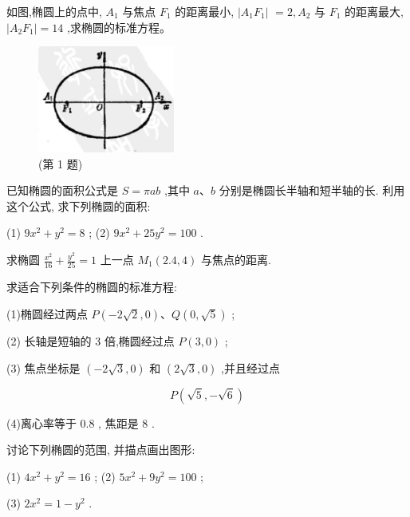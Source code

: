 \documentclass[lang=cn,newtx,12pt,scheme=chinese]{elegantbook}
\begin{document}
\begin{problemset}[习 题 六]

\item 如图,椭圆上的点中, \({A}_{1}\) 与焦点 \({F}_{1}\) 的距离最小, \(\left| {{A}_{1}{F}_{1}}\right|\) \(= 2,{A}_{2}\) 与 \({F}_{1}\) 的距离最大, \(\left| {{A}_{2}{F}_{1}}\right| = {14}\) ,求椭圆的标准方程。

\begin{figure}[h]
	\centering
	\includegraphics[max width=0.4\textwidth]{images/01912cc2-ffb6-728e-9ae7-b113ff05c64b_94_706053.jpg}
	\caption{(第 1 题)}
\end{figure}

\item 已知椭圆的面积公式是 \(S = {\pi ab}\) ,其中 \(a\text{、}b\) 分别是椭圆长半轴和短半轴的长. 利用这个公式, 求下列椭圆的面积:

(1) \(9{x}^{2} + {y}^{2} = 8\) ; (2) \(9{x}^{2} + {25}{y}^{2} = {100}\) .

\item 求椭圆 \(\frac{{x}^{2}}{16} + \frac{{y}^{2}}{25} = 1\) 上一点 \({M}_{1}\left( {{2.4},4}\right)\) 与焦点的距离.

\item 求适合下列条件的椭圆的标准方程:

(1)椭圆经过两点 \(P\left( {-2\sqrt{2},0}\right) \text{、}Q\left( {0,\sqrt{5}}\right)\) ;

(2) 长轴是短轴的 3 倍,椭圆经过点 \(P\left( {3,0}\right)\) ;

(3) 焦点坐标是 \(\left( {-2\sqrt{3},0}\right)\) 和 \(\left( {2\sqrt{3},0}\right)\) ,并且经过点

\[
  P\left( {\sqrt{5}, - \sqrt{6}}\right)
\]

(4)离心率等于 0.8 , 焦距是 8 .

\item 讨论下列椭圆的范围, 并描点画出图形:

(1) \(4{x}^{2} + {y}^{2} = {16}\) ; (2) \(5{x}^{2} + 9{y}^{2} = {100}\) ;

(3) \(2{x}^{2} = 1 - {y}^{2}\) .


\end{problemset}
\end{document}
